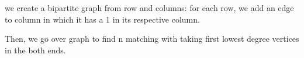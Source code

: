 we create a bipartite graph from row and columns: for each row, we add an edge to column in which it has a 1 in its respective column.

Then, we go over graph to find n matching with taking first lowest degree vertices in the both ends.